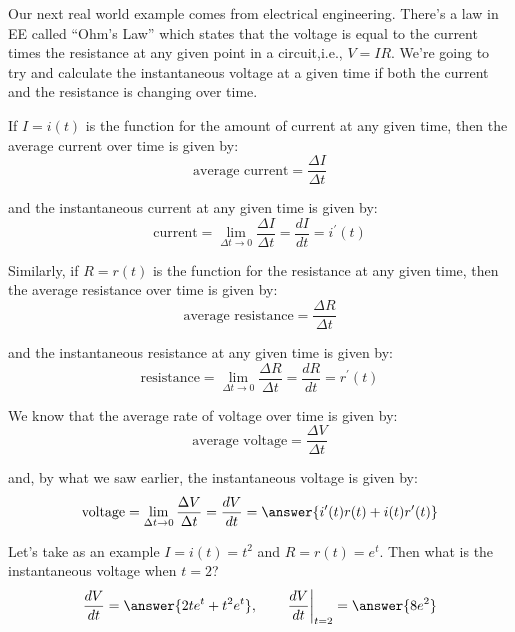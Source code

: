 \documentclass{ximera}
\begin{document}
\begin{example}\label{example:5-12}
Our next real world example comes from electrical engineering. There's a law in EE called ``Ohm's Law'' which states that the voltage is equal to the current times the resistance at any given point in a circuit,i.e., $V=I R$. We're going to try and calculate the instantaneous voltage at a given time if both the current and the resistance is changing over time.

If $I=i(t)$ is the function for the amount of current at any given time, then the average current over time is given by:
\[
\text{average current}=\frac{\Delta I}{\Delta t}
\]

and the instantaneous current at any given time is given by:
\[
\text{current}=\lim _{\Delta t \rightarrow 0} \frac{\Delta I}{\Delta t}=\frac{d I}{d t}=i^{\prime}(t)
\]

Similarly, if $R=r(t)$ is the function for the resistance at any given time, then the average resistance over time is given by:
\[
\text{average resistance}=\frac{\Delta R}{\Delta t}
\]

and the instantaneous resistance at any given time is given by:
\[
\text{resistance}=\lim _{\Delta t \rightarrow 0} \frac{\Delta R}{\Delta t}=\frac{d R}{d t}=r^{\prime}(t)
\]

We know that the average rate of voltage over time is given by:
\[
\text{average voltage}=\frac{\Delta V}{\Delta t}
\]

and, by what we saw earlier, the instantaneous voltage is given by:
\[
\text{voltage}=\lim _{\Delta t \rightarrow 0} \frac{\Delta V}{\Delta t}=\frac{d V}{d t}=\answer{i^{\prime}(t) r(t)+i(t) r^{\prime}(t)}
\]

Let's take as an example $I=i(t)=t^{2}$ and $R=r(t)=e^{t}$. Then what is the instantaneous voltage when $t=2$?
\[
\frac{d V}{d t}=\answer{2 t e^{t}+t^{2} e^{t}}, \qquad \left.\frac{d V}{d t}\right|_{t=2}=\answer{8 e^{2}}
\]
\end{example}
\end{document}

